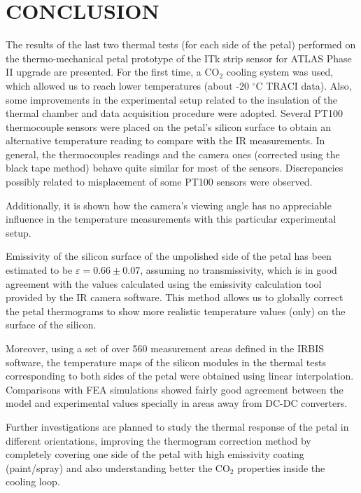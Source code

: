 \pagestyle{conclusions}

\section*{\uppercase{Conclusion}}\label{concl}
	\bigskip
	\bigskip
	The results of the last two thermal tests (for each side of the petal) performed on the thermo-mechanical petal prototype of the ITk strip sensor for ATLAS Phase II upgrade are presented. For the first time, a CO$_{2}$ cooling system was used, which allowed us to reach lower temperatures (about -20 $^{\circ}$C TRACI data). Also, some improvements in the experimental setup related to the insulation of the thermal chamber and data acquisition procedure were adopted. Several PT100 thermocouple sensors were placed on the petal’s silicon surface to obtain an alternative temperature reading to compare with the IR measurements. In general, the thermocouples readings and the camera ones (corrected using the black tape method) behave quite similar for most of the sensors. Discrepancies possibly related to misplacement of some PT100 sensors were observed.
	
	Additionally, it is shown how the camera’s viewing angle has no appreciable influence in the temperature measurements with this particular experimental setup.
		
	Emissivity of the silicon surface of the unpolished side of the petal has been estimated to be $\varepsilon=0.66 \pm 0.07$, assuming no transmissivity, which is in good agreement with the values calculated using the emissivity calculation tool provided by the IR camera software. This method allows us to globally correct the petal thermograms to show more realistic temperature values (only) on the surface of the silicon. 
		
	Moreover, using a set of over 560 measurement areas defined in the IRBIS software, the temperature maps of the silicon modules in the thermal tests corresponding to both sides of the petal were obtained using linear interpolation. Comparisons with FEA simulations showed fairly good agreement between the model and experimental values specially in areas away from DC-DC converters.
	
	Further investigations are planned to study the thermal response of the petal in different orientations, improving the thermogram correction method by completely covering one side of the petal with high emissivity coating (paint/spray) and also understanding better the CO$_{2}$ properties inside the cooling loop.
	 
	